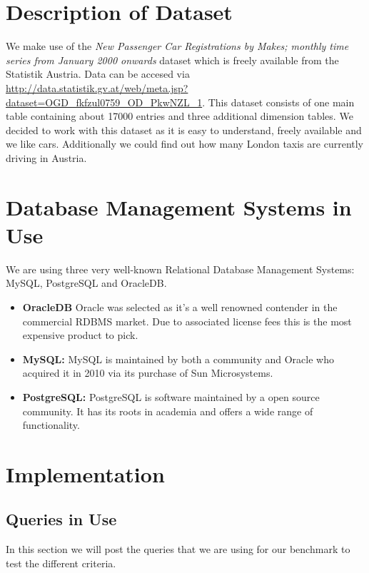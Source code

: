 \documentclass[runningheads]{llncs}
\begin{document}
\section{Description of Dataset}

We make use of the \textit{New Passenger Car Registrations by Makes; monthly time series from January 2000 onwards} dataset which is freely available from the Statistik Austria. Data can be accesed via 
\url{http://data.statistik.gv.at/web/meta.jsp?dataset=OGD_fkfzul0759_OD_PkwNZL_1}. 
This dataset consists of one main table containing about 17000 entries and three additional dimension tables. 
We decided to work with this dataset as it is easy to understand, freely available and we like cars. Additionally we could find out how many London taxis are currently driving in Austria. 

\section{Database Management Systems in Use}
We are using three very well-known Relational Database Management Systems: MySQL, PostgreSQL and OracleDB. 

\begin{itemize}
    \item \textbf{OracleDB}
    Oracle was selected as it's a well renowned contender in the commercial RDBMS market. Due to associated license fees this is the most expensive product to pick. 
    
    \item \textbf{MySQL:}
    MySQL is maintained by both a community and Oracle who acquired it in 2010 via its purchase of Sun Microsystems. 
    
    \item \textbf{PostgreSQL:}
    PostgreSQL is software maintained by a open source community. It has its roots in academia and offers a wide range of functionality. 
    
\end{itemize}
\section{Implementation}
\subsection{Queries in Use}
In this section we will post the queries that we are using for our benchmark to test the different criteria.
\end{document}
